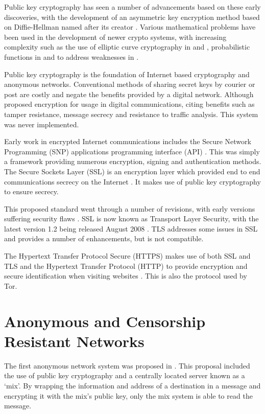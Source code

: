 \documentclass{ecuthesis}
\begin{document}
Public key cryptography has seen a number of advancements based on these early discoveries, with the development of an asymmetric key encryption method based on Diffie-Hellman named after its creator \citet*{ElGamal:1985p529}. Various mathematical problems have been used in the development of newer crypto systems, with increasing complexity such as the use of  elliptic curve cryptography in \cite{Miller:1986p2966} and \cite{Koblitz:1987p3109}, probabilistic functions in \cite{Paillier:1999p3152} and to address weaknesses in \cite{Cramer:1998p3186}.

Public key cryptography is the foundation of Internet based cryptography and anonymous networks. Conventional methods of sharing secret keys by courier or post are costly and negate the benefits provided by a digital network. Although \cite{Baran:1964p384} proposed encryption for usage in digital communications, citing benefits such as tamper resistance, message secrecy and resistance to traffic analysis. This system was never implemented.

Early work in encrypted Internet communications includes the Secure Network Programming (SNP) applications programming interface (API) \citep{Woo:1994p2532}. This was simply a framework providing numerous encryption, signing and authentication methods. The Secure Sockets Layer (SSL) is an encryption layer which provided end to end communications secrecy on the Internet \citep{website:SSL}. It makes use of public key cryptography to ensure secrecy.

This proposed standard went through a number of revisions, with early versions suffering security flaws \citep{Wagner:1996p385}. SSL is now known as Transport Layer Security, with the latest version 1.2 being released August 2008 \citep{website:TLS}. TLS addresses some issues in SSL and provides a number of enhancements, but is not compatible.

The Hypertext Transfer Protocol Secure (HTTPS) makes use of both SSL and TLS and the Hypertext Transfer Protocol (HTTP) to provide encryption and secure identification when visiting websites \citep{website:HTTPS}. This is also the protocol used by Tor.

\section{Anonymous and Censorship Resistant Networks}

The first anonymous network system was proposed in \cite{Chaum:1981p296}. This proposal included the use of public key cryptography and a centrally located server known as a ‘mix’. By wrapping the information and address of a destination in a message and encrypting it with the mix’s public key, only the mix system is able to read the message.
\end{document}
